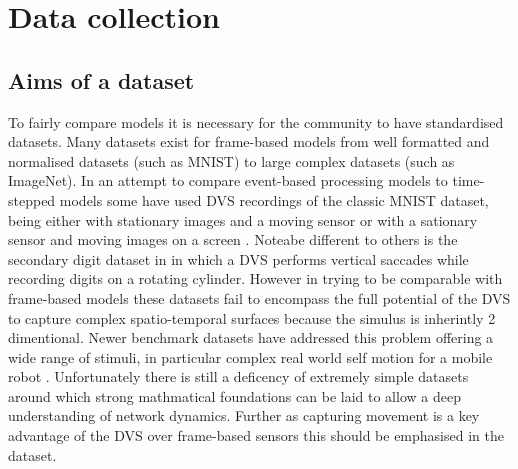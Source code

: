 \chapter{Data collection}

\section{Aims of a dataset}
To fairly compare models it is necessary for the community to have standardised datasets\cite{barranco2016dataset, Gibson2014, tan2015benchmarking}.
Many datasets exist for frame-based models from well formatted and normalised datasets (such as MNIST\cite{lecun1998gradient}) to large complex datasets (such as ImageNet\cite{deng2009imagenet}).
In an attempt to compare event-based processing models to time-stepped models some have used DVS recordings of the classic MNIST dataset, being either with stationary images and a moving sensor \cite{OConnor2013, orchard2015converting} or with a sationary sensor and moving images on a screen \cite{serrano2015poker, akolkar2015can}.
Noteabe different to others is the secondary digit dataset in \cite{akolkar2015can} in which a DVS performs vertical saccades while recording digits on a rotating cylinder.
However in trying to be comparable with frame-based models these datasets fail to encompass the full potential of the DVS to capture complex spatio-temporal surfaces because the simulus is inherintly 2 dimentional.
Newer benchmark datasets have addressed this problem offering a wide range of stimuli, in particular complex real world self motion for a mobile robot \cite{Gibson2014, barranco2016dataset}. 
Unfortunately there is still a deficency of extremely simple datasets around which strong mathmatical foundations can be laid to allow a deep understanding of network dynamics.
Further as capturing movement is a key advantage of the DVS over frame-based sensors this should be emphasised in the dataset. 

